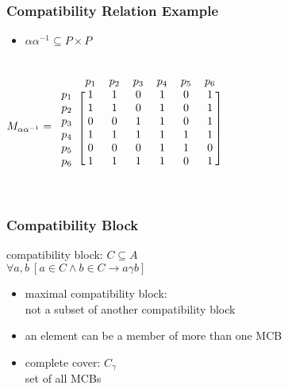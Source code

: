 \documentclass[dvipsnames]{beamer}
\begin{document}
\begin{frame}
  \frametitle{Compatibility Relation Example}

  \begin{itemize}
   \item $\alpha \alpha^{-1} \subseteq P \times P$
  \end{itemize}

  \begin{columns}
    \[
      M_{\alpha \alpha^{-1}} =
        \begin{blockarray}{ccccccc}
                & p_1 & p_2 & p_3 & p_4 & p_5 & p_6\\
          \begin{block}{c[cccccc]}
            p_1 &  1  &  1  &  0  &  1  &  0  &  1\\
            p_2 &  1  &  1  &  0  &  1  &  0  &  1\\
            p_3 &  0  &  0  &  1  &  1  &  0  &  1\\
            p_4 &  1  &  1  &  1  &  1  &  1  &  1\\
            p_5 &  0  &  0  &  0  &  1  &  1  &  0\\
            p_6 &  1  &  1  &  1  &  1  &  0  &  1\\
          \end{block}
       \end{blockarray}
    \]

    \begin{center}
    \end{center}
  \end{columns}
\end{frame}

\begin{frame}
  \frametitle{Compatibility Block}

  \begin{definition}
    \alert{compatibility block}: $C \subseteq A$\\
      $\forall a,b~[a \in C \wedge b \in C \rightarrow a \gamma b]$
  \end{definition}

  \pause
  \medskip
  \begin{itemize}
    \item \alert{maximal compatibility block}:\\
      not a subset of another compatibility block
    \item an element can be a member of more than one MCB

    \pause
    \medskip
    \item \alert{complete cover}: $C_\gamma$\\
      set of all MCBs
  \end{itemize}
\end{frame}
\end{document}
